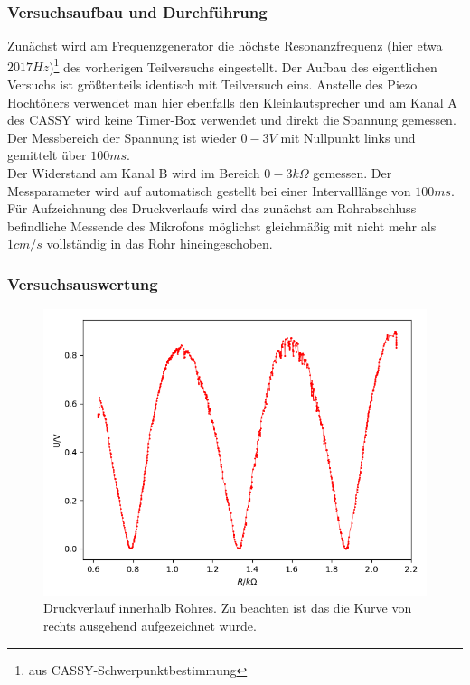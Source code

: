 \documentclass[12pt,a4paper]{article}
\begin{document}
\subsubsection{Versuchsaufbau und Durchführung}
Zunächst wird am Frequenzgenerator die höchste Resonanzfrequenz (hier etwa $2017Hz$)\footnote{aus CASSY-Schwerpunktbestimmung} des vorherigen Teilversuchs eingestellt.
Der Aufbau des eigentlichen Versuchs ist größtenteils identisch mit Teilversuch eins. Anstelle des Piezo Hochtöners verwendet man hier ebenfalls den Kleinlautsprecher und am Kanal A des CASSY wird keine Timer-Box verwendet und direkt die Spannung gemessen. Der Messbereich der Spannung ist wieder $0-3V$ mit Nullpunkt links und gemittelt über $100ms$.\\
Der Widerstand am Kanal B wird im Bereich $0-3k \Omega $ gemessen.
Der Messparameter wird auf automatisch gestellt bei einer Intervalllänge von $100ms$.\\
Für Aufzeichnung des Druckverlaufs wird das zunächst am Rohrabschluss  befindliche Messende des Mikrofons möglichst gleichmäßig mit nicht mehr als $1cm/s$ vollständig in das Rohr hineingeschoben.

\subsubsection{Versuchsauswertung}

\begin{figure}
	\includegraphics[width=\linewidth]{druckverlauf}
	\caption{Druckverlauf innerhalb Rohres. Zu beachten ist das die Kurve von rechts ausgehend aufgezeichnet wurde.}
	\label{Druckverlauf}
\end{figure}
\end{document}
